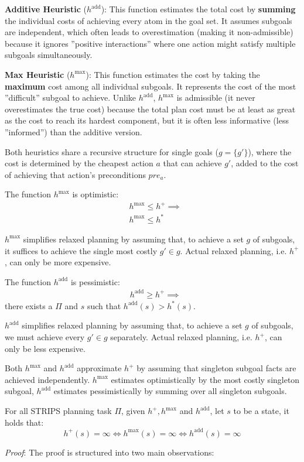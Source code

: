 \documentclass[10pt, letterpaper]{report}
\begin{document}
\noindent\textbf{Additive Heuristic} ($h^{\text{add}}$): This function estimates the total cost by \textbf{summing} the individual costs of achieving every atom in the goal set. It assumes subgoals are independent, which often leads to overestimation (making it non-admissible) because it ignores ''positive interactions'' where one action might satisfy multiple subgoals simultaneously.\bigskip

\noindent\textbf{Max Heuristic} ($h^{\text{max}}$): This function estimates the cost by taking the \textbf{maximum} cost among all individual subgoals. It represents the cost of the most ''difficult'' subgoal to achieve. Unlike $h^{\text{add}}$, $h^{\text{max}}$ is admissible (it never overestimates the true cost) because the total plan cost must be at least as great as the cost to reach its hardest component, but it is often less informative (less ''informed'') than the additive version.

Both heuristics share a recursive structure for single goals ($g = \{g'\}$), where the cost is determined by the cheapest action $a$ that can achieve $g'$, added to the cost of achieving that action's preconditions $pre_a$.

\begin{proposition}
    The function $h^{\max}$ is optimistic:\begin{align}
        &h^{\max}\le h^+\implies\\ &h^{\max}\le h^*
    \end{align}
\end{proposition}
 $h^{\max}$ simplifies relaxed planning by assuming that, to achieve a set $g$
 of subgoals, it suffices to achieve the single most costly $g' \in g$. Actual relaxed
 planning, i.e. $h^+$, can only be more expensive.
 \begin{proposition}
    The function $h^{\text{add}}$ is pessimistic:\begin{align}
        &h^{\text{add}}\ge h^+\implies
    \end{align}
    there exists a $\Pi$ and $s$ such that $h^{\text{add}}(s)>h^*(s)$.
\end{proposition}
$h^{\text{add}}$ simplifies relaxed planning by assuming that, to achieve a set $g$
 of subgoals, we must achieve every $g'\in g$ separately. Actual relaxed planning,
 i.e. $h^+$, can only be less expensive.\bigskip 

 Both $h^{\max}$ and $h^{\text{add}}$ approximate $h^+$ by assuming that singleton subgoal
 facts are achieved independently. $h^{\max}$ estimates optimistically by the most
 costly singleton subgoal, $h^{\text{add}}$ estimates pessimistically by summing over all
 singleton subgoals.
 \begin{proposition}
    For all STRIPS planning task $\Pi$, given $h^+,h^{\max}$ and $h^{\text{add}}$, let $s$ to be a state, it holds that:\begin{equation}
        h^+(s)=\infty\iff h^{\max}(s)=\infty \iff h^{\text{add}}(s)=\infty
    \end{equation}
 \end{proposition}
 \textit{Proof}: The proof is structured into two main observations:
\end{document}
